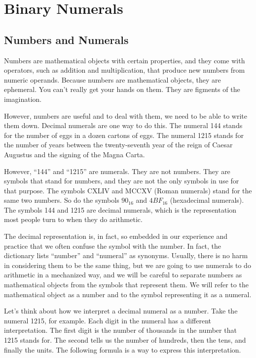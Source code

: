 \chapter{Binary Numerals}
\label{ch:binary-numerals}
\section{Numbers and Numerals}
\label{sec:numbers-numerals}
Numbers are mathematical objects with certain properties,
and they come with operators, such as addition
and multiplication, that produce new numbers from numeric
operands.
Because numbers are mathematical objects, they are ephemeral.
You can't really get your hands on them.
They are figments of the imagination.

However, numbers are useful and to deal with them,
we need to be able to write them down.
Decimal numerals are one way to do this.
The numeral 144 stands for the number
of eggs in a dozen cartons of eggs.
The numeral 1215 stands for the number of
years between the twenty-seventh year of the reign
of Caesar Augustus and the signing of the Magna Carta.

However, ``144'' and ``1215'' are numerals.
They are not numbers. They are symbols that stand for numbers,
and they are not the only symbols in use for that purpose.
The symbols CXLIV and MCCXV (Roman numerals) stand for the same two numbers.
So do the symbols $90_{16}$ and $4BF_{16}$ (hexadecimal numerals).
The symbols 144 and 1215 are decimal numerals,
which is the representation most
people turn to when they do arithmetic.

The decimal representation is, in fact, so embedded in
our experience and practice that we often confuse
the symbol with the number.
In fact, the dictionary lists ``number'' and ``numeral'' as synonyms.
Usually, there is no harm in considering them to be the same thing,
but we are going to use numerals
to do arithmetic in a mechanized way, and we will
be careful to separate numbers as mathematical
objects from the symbols that represent them.
We will refer to the mathematical object as a number
and to the symbol representing it as a numeral.

Let's think about how we interpret a decimal numeral as a number.
Take the numeral 1215, for example.
Each digit in the numeral has a different interpretation.
The first digit is the number of thousands in the number
that 1215 stands for. The second tells us the number
of hundreds, then the tens, and finally the units.
The following formula is a way to express this interpretation.

